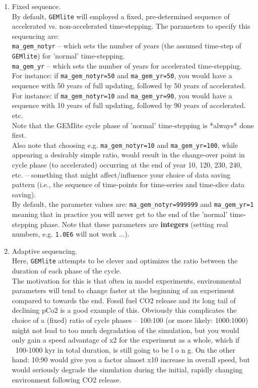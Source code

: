 \begin{enumerate}

\vspace{1mm}
        \item Fixed sequence.
        \\By default, \texttt{GEMlite} will employed a fixed, pre-determined sequence of accelerated vs. non-accelerated time-stepping. The parameters to specify this sequencing are:
        \\\texttt{ma\_gem\_notyr} -- which sets the number of years (the assumed time-step of \texttt{GEMlite}) for 'normal' time-stepping.
        \\\texttt{ma\_gem\_yr} -- which sets the number of years for accelerated time-stepping.
\\For instance: if \texttt{ma\_gem\_notyr=50} and \texttt{ma\_gem\_yr=50}, you would have a sequence with 50 years of full updating, followed by 50 years of accelerated.
\\For instance: if \texttt{ma\_gem\_notyr=10} and \texttt{ma\_gem\_yr=90}, you would have a sequence with 10 years of full updating, followed by 90 years of accelerated.
\\etc.
\\Note that the GEMlite cycle phase of 'normal' time-stepping is *always* done first.
\\Also note that choosing e.g. \texttt{ma\_gem\_notyr=10} and \texttt{ma\_gem\_yr=100}, while appearing a desirably simple ratio, would result in the change-over point in cycle phase (to accelerated) occurring at the end of year 10, 120, 230, 240, etc. -- something that might affect/influence your choice of data saving pattern (i.e., the sequence of time-points for time-series and time-slice data saving).
\\By default, the parameter values are: \texttt{ma\_gem\_notyr=999999} and \texttt{ma\_gem\_yr=1} meaning that in practice you will never get to the end of the 'normal' time-stepping phase. Note that these parameters are \textbf{integers} (setting real numbers, e.g. \texttt{1.0E6} will not work ...).

\vspace{1mm}
        \item Adaptive sequencing.
        \\Here, \texttt{GEMlite} attempts to be clever and optimizes the ratio between the duration of each phase of the cycle.
        \\The motivation for this is that often in model experiments, environmental parameters will  tend to change faster at the beginning of an experiment compared to towards the end. Fossil fuel CO2 release and its long tail of declining pCo2 is a good example of this. Obviously this complicates the choice of a (fixed) ratio of cycle phases -- 100:100 (or more likely: 1000:1000) might not lead to too much degradation of the simulation, but you would only gain a speed advantage of x2 for the experiment as a whole, which if ~100-1000 kyr in total duration, is still going to be l o n g. On the other hand: 10:90 would give you a factor almost x10 increase in overall speed, but would seriously degrade the simulation during the initial, rapidly changing environment following CO2 release.


\end{enumerate}

